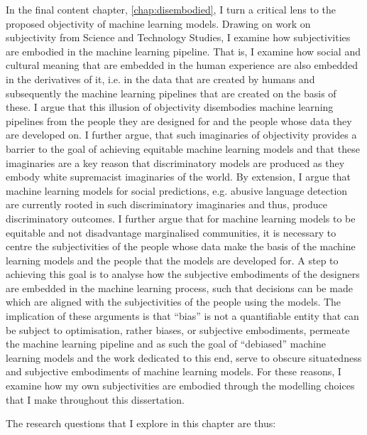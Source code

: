 In the final content chapter, \cref{chap:disembodied}, I turn a critical lens to the proposed objectivity of machine learning models.
Drawing on work on subjectivity from Science and Technology Studies, I examine how subjectivities are embodied in the machine learning pipeline.
That is, I examine how social and cultural meaning that are embedded in the human experience are also embedded in the derivatives of it, i.e. in the data that are created by humans and subsequently the machine learning pipelines that are created on the basis of these.
I argue that this illusion of objectivity disembodies machine learning pipelines from the people they are designed for and the people whose data they are developed on.
I further argue, that such imaginaries of objectivity provides a barrier to the goal of achieving equitable machine learning models and that these imaginaries are a key reason that discriminatory models are produced as they embody white supremacist imaginaries of the world.
By extension, I argue that machine learning models for social predictions, e.g. abusive language detection are currently rooted in such discriminatory imaginaries and thus, produce discriminatory outcomes.
I further argue that for machine learning models to be equitable and not disadvantage marginalised communities, it is necessary to centre the subjectivities of the people whose data make the basis of the machine learning models and the people that the models are developed for.
A step to achieving this goal is to analyse how the subjective embodiments of the designers are embedded in the machine learning process, such that decisions can be made which are aligned with the subjectivities of the people using the models.
The implication of these arguments is that ``bias'' is not a quantifiable entity that can be subject to optimisation, rather biases, or subjective embodiments, permeate the machine learning pipeline and as such the goal of ``debiased'' machine learning models and the work dedicated to this end, serve to obscure situatedness and subjective embodiments of machine learning models.
For these reasons, I examine how my own subjectivities are embodied through the modelling choices that I make throughout this dissertation.

The research questions that I explore in this chapter are thus:

